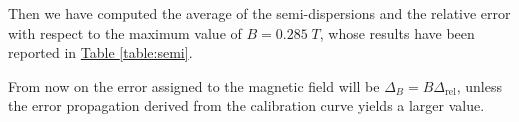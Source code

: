 \documentclass[a4paper,12pt,abstracton]{scrartcl}
\begin{document}
Then we have computed the average of the semi-dispersions and the relative error with respect to the maximum value of $B=0.285\;T$, whose results have been reported in \hyperref[table:semi]{ Table \ref*{table:semi}}.

\begin{table}[H]
\centering
\caption{}
\label{table:semi}
\end{table}

From now on the error assigned to the magnetic field will be $\Delta_B=B\Delta_{\text{rel}}$, unless the error propagation derived from the calibration curve yields a larger value. 

\clearpage
\end{document}
